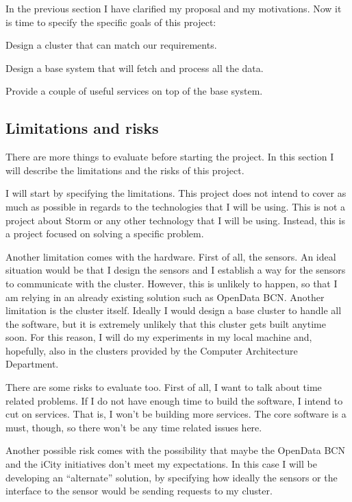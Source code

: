 In the previous section I have clarified my proposal and my motivations. Now
it is time to specify the specific goals of this project:

\mylist
  \item Design a cluster that can match our requirements.
  \item Design a base system that will fetch and process all the data.
  \item Provide a couple of useful services on top of the base system.
\mylistend

\subsection{Limitations and risks}

There are more things to evaluate before starting the project. In this section
I will describe the limitations and the risks of this project.

I will start by specifying the limitations. This project does not intend to
cover as much as possible in regards to the technologies that I will be using.
This is not a project about Storm or any other technology that I will be using.
Instead, this is a project focused on solving a specific problem.

Another limitation comes with the hardware. First of all, the sensors. An ideal
situation would be that I design the sensors and I establish a way for the
sensors to communicate with the cluster. However, this is unlikely to happen,
so that I am relying in an already existing solution such as OpenData BCN.
Another limitation is the cluster itself. Ideally I would design a base cluster
to handle all the software, but it is extremely unlikely that this cluster
gets built anytime soon. For this reason, I will do my experiments in my local
machine and, hopefully, also in the clusters provided by the Computer
Architecture Department.

There are some risks to evaluate too. First of all, I want to talk about time
related problems. If I do not have enough time to build the software, I intend
to cut on services. That is, I won't be building more services. The core
software is a must, though, so there won't be any time related issues here.

Another possible risk comes with the possibility that maybe the OpenData BCN
and the iCity initiatives don't meet my expectations. In this case I will be
developing an ``alternate'' solution, by specifying how ideally the sensors or
the interface to the sensor would be sending requests to my cluster.

